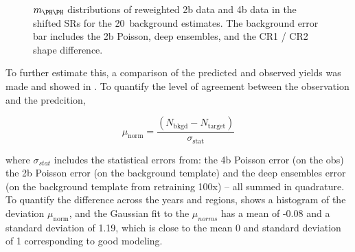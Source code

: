 \begin{figure}[ht]
    \centering
 
    \caption{$m_{\higgs\higgs}$ distributions of reweighted 2b data and 4b data in the shifted SRs for the 20\yr \ background estimates. 
             The background error bar includes the 2b Poisson, deep ensembles, and the CR1 / CR2 shape difference.}
    \label{fig:bkgd4b-20\yr-shifted-region}
\end{figure}

To further estimate this, a comparison of the predicted and observed yields was made and showed in \Tab{\ref{tab:shifted-4b-yields}}. To quantify the level of agreement between the observation and the predcition, 

\begin{equation}
    \mu_{\mathrm{norm}} = \frac{(N_{\mathrm{bkgd}}-N_{\mathrm{target}})}{\sigma_{\mathrm{stat}}}
    \label{eq:shifted-norm}
\end{equation}

where $\sigma_{stat}$ includes the statistical errors from: the 4b Poisson error (on the obs) the 2b Poisson error (on the background template) and the deep ensembles error (on the background template from retraining 100x)  -- all summed in quadrature. To quantify the difference across the years and regions, \Fig{\ref{shift-norms}} shows a histogram of the deviation $\mu_\mathrm{norm}$, and the Gaussian fit to the $\mu_{norms}$ has a mean of -0.08 and a standard deviation of 1.19, which is close to the mean 0 and standard deviation of 1 corresponding to good modeling.
 
